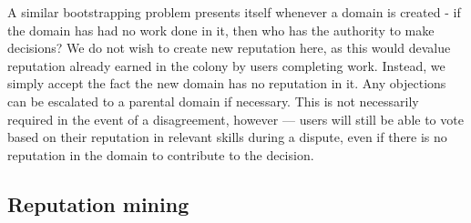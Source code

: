 A similar bootstrapping problem presents itself whenever a domain is created - if the domain has had no work done in it, then who has the authority to make decisions? We do not wish to create new reputation here, as this would devalue reputation already earned in the colony by users completing work. Instead, we simply accept the fact the new domain has no reputation in it. Any objections can be escalated to a parental domain if necessary. This is not necessarily required in the event of a disagreement, however --- users will still be able to vote based on their reputation in relevant skills during a dispute, even if there is no reputation in the domain to contribute to the decision.

\subsection{Reputation mining}\label{sec:reputationmining}

